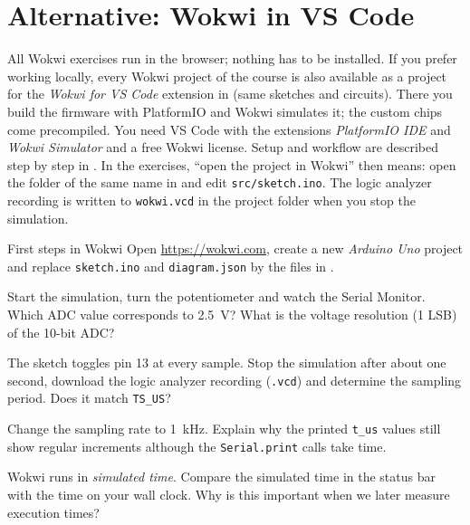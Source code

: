\section*{Alternative: Wokwi in VS Code}

All Wokwi exercises run in the browser; nothing has to be installed. If you
prefer working locally, every Wokwi project of the course is also available as
a project for the \emph{Wokwi for VS Code} extension in
 (same sketches and circuits). There you build the
firmware with PlatformIO and Wokwi simulates it; the custom chips come
precompiled. You need VS Code with the extensions \emph{PlatformIO IDE} and
\emph{Wokwi Simulator} and a free Wokwi license. Setup and workflow are
described step by step in . In the
exercises, ``open the project in Wokwi'' then means: open the folder of
the same name in  and edit \texttt{src/sketch.ino}.
The logic analyzer recording is written to \texttt{wokwi.vcd} in the project
folder when you stop the simulation.

\begin{exercise}{First steps in Wokwi}{\Wokwi}
Open \url{https://wokwi.com}, create a new \emph{Arduino Uno} project and replace
\texttt{sketch.ino} and \texttt{diagram.json} by the files in
.
\begin{tasks}
  \item Start the simulation, turn the potentiometer and watch the Serial
    Monitor. Which ADC value corresponds to \SI{2.5}{V}? What is the
    voltage resolution (1 LSB) of the 10-bit ADC?
  \item The sketch toggles pin 13 at every sample. Stop the simulation after
    about one second, download the logic analyzer recording (\texttt{.vcd})
    and determine the sampling period. Does it match \texttt{TS\_US}?
  \item Change the sampling rate to \SI{1}{kHz}. Explain why the printed
    \texttt{t\_us} values still show regular increments although the
    \texttt{Serial.print} calls take time.
  \item Wokwi runs in \emph{simulated time}. Compare the simulated time in the
    status bar with the time on your wall clock. Why is this important when
    we later measure execution times?
\end{tasks}
\end{exercise}

